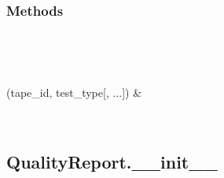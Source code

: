 \documentclass[letterpaper,10pt,english]{sphinxmanual}
\begin{document}
\begin{fulllineitems}
\begin{fulllineitems}
\label{\detokenize{generated/quality_assessment.data_types.QualityReport.test_type:quality_assessment.data_types.QualityReport.test_type}}
\end{fulllineitems}

\subsubsection*{Methods}


\begin{savenotes}\sphinxatlongtablestart\begin{longtable}[c]{}
\hline

\endfirsthead

%
{}\\
\hline

\endhead

\hline
{}\\
\endfoot

\endlastfoot

\sphinxAtStartPar
{\hyperref[\detokenize{generated/quality_assessment.data_types.QualityReport.__init__:quality_assessment.data_types.QualityReport.__init__}]{}}(tape\_id, test\_type{[}, ...{]})
&
\sphinxAtStartPar

\\
\hline
\end{longtable}\sphinxatlongtableend\end{savenotes}


\subsection{QualityReport.\_\_init\_\_}
\label{\detokenize{generated/quality_assessment.data_types.QualityReport.__init__:qualityreport-init}}\label{\detokenize{generated/quality_assessment.data_types.QualityReport.__init__::doc}}


\end{fulllineitems}
\end{document}
